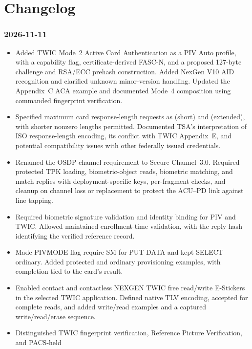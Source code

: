 \section*{Changelog}

\subsubsection*{2026-11-11}
\begin{itemize}
  \item Added TWIC Mode~2 Active Card Authentication as a PIV Auto profile, with a capability flag,
    certificate-derived FASC-N, and a proposed 127-byte challenge and RSA/ECC prehash construction.
    Added NexGen V10 AID recognition and clarified unknown minor-version handling. Updated the
    Appendix~C ACA example and documented Mode~4 composition using commanded fingerprint
    verification.
  \item Specified maximum card response-length requests as  (short) and 
    (extended), with shorter nonzero lengths permitted. Documented TSA's interpretation of ISO
    response-length encoding, its conflict with TWIC Appendix~E, and potential compatibility issues
    with other federally issued credentials.
  \item Renamed the OSDP channel requirement to Secure Channel~3.0. Required protected TPK loading,
    biometric-object reads, biometric matching, and match replies with deployment-specific keys,
    per-fragment checks, and cleanup on channel loss or replacement to protect the ACU--PD link
    against line tapping.
  \item Required biometric signature validation and identity binding for PIV and TWIC. Allowed
    maintained enrollment-time validation, with the reply hash identifying the verified reference
    record.
  \item Made PIVMODE flag  require SM for PUT DATA and kept SELECT ordinary. Added
    protected and ordinary provisioning examples, with completion tied to the card's result.
  \item Enabled contact and contactless NEXGEN TWIC free read/write E-Stickers in the selected TWIC
    application. Defined native TLV encoding, accepted  for complete reads, and added
    write/read examples and a captured write/read/erase sequence.
  \item Distinguished TWIC fingerprint verification, Reference Picture Verification, and PACS-held

\end{itemize}
